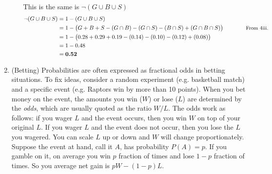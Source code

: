\documentclass[11pt]{article}
\begin{document}
\begin{enumerate}
\begin{enumerate}
\begin{mdframed}
							This is the same is $ \neg (G \cup B \cup S) $
							\begin{align*}
								\neg (G \cup B \cup S) &= 1 - (G \cup B \cup S)\\
								&= 1 - {\left( G + B + S - \left(G \cap B \right) - \left(G \cap S \right) - \left(B \cap S \right)  + \left( G \cap B \cap S \right) \right)} \qquad\qquad\text{{\small From 4iii.}} \\
								&= 1 - \left( 0.28 + 0.29 + 0.19 - \left(0.14\right) - \left(0.10\right) - \left(0.12\right)  + \left(0.08\right) \right)\\
								&= 1 - 0.48\\
								&= \textbf{0.52}
							\end{align*}
						\end{mdframed}
				\end{enumerate}

		\item (Betting) Probabilities are often expressed as fractional odds in betting situations. To fix ideas, consider a random experiment (e.g. basketball match) and a specific event (e.g. Raptors win by more than 10 points). When you bet money on the event, the amounts you win ($ W $) or lose ($ L $) are determined by the \textit{odds}, which are usually quoted as the ratio $ W/L $. The odds work as follows: if you wager $ L $ and the event occurs, then you win $ W $ on top of your original $ L $. If you wager $ L $ and the event does not occur, then you lose the $ L $ you wagered. You can scale $ L $ up or down and $ W $ will change proportionately. Suppose the event at hand, call it $ A $, has probability $ P (A) = p $. If you gamble on it, on average you win $ p $ fraction of times and lose $ 1-p $ fraction of times. So you average net gain is $ pW - (1 - p) L $.

	\end{enumerate}
\end{document}
